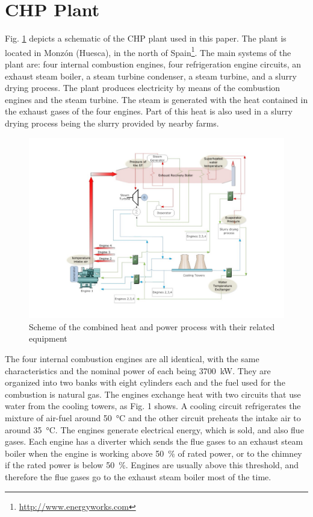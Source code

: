 \section{CHP Plant}
\label{plant}

Fig. \ref{figplant} depicts a schematic of the CHP plant used in this paper. The plant is located in Monz\'on (Huesca), in the north of Spain\footnote{\url{http://www.energyworks.com}}. The main systems of the plant are: four internal combustion engines, four refrigeration engine circuits, an exhaust steam boiler, a steam turbine condenser, a steam turbine, and a slurry drying process. The plant produces electricity by means of the combustion engines and the steam turbine. The steam is generated with the heat contained in the exhaust gases of the four engines. Part of this heat is also used in a slurry drying process being the slurry provided by nearby farms.

\begin{figure}
\includegraphics[width=1\textwidth]{plant.pdf}
\caption{Scheme of the combined heat and power process with their related equipment}
\label{figplant}
\end{figure}

The four internal combustion engines are all identical, with the same characteristics and the nominal power of each being \SI{3700}{kW}. They are organized into two banks with eight cylinders each and the fuel used for the combustion is natural gas. The engines exchange heat with two circuits that use water from the cooling towers, as Fig. 1 shows. A cooling circuit refrigerates the mixture of air-fuel around \SI{50}{\celsius} and the other circuit preheats the intake air to around \SI{35}{\celsius}. The engines generate electrical energy, which is sold,  and also flue gases. Each engine has a diverter which sends the flue gases to an exhaust steam boiler when the engine is working above \SI{50}{\percent} of rated power, or to the chimney if the rated power is below \SI{50}{\percent}. Engines are usually above this threshold, and therefore the flue gases go to the exhaust steam boiler most of the time. 

